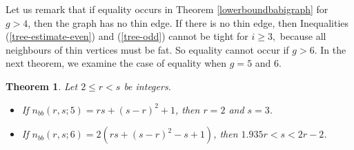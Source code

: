 \documentclass[a4paper,11pt]{article}
\newtheorem{theorem}{Theorem}[section]
\begin{document}
Let us remark that if equality occurs in Theorem \ref{lowerboundbabigraph} for $g>4$, then 
the graph has no thin edge. If there is no thin edge, then Inequalities (\ref{tree-estimate-even})
and (\ref{tree-odd}) cannot be tight for $i\geq 3,$ because all neighbours of thin vertices must
be fat. So equality cannot occur if $g>6$.
In the next theorem, we examine the case of equality when $g=5$ and $6.$

\begin{theorem}\label{equal-5-6}
Let $2\leq r<s$ be integers.  
\begin{itemize}
\item
If $n_{bb}(r,s;5)=rs+(s-r)^2+1$, then $r=2$ and $s=3$.
\item
If $n_{bb}(r,s;6)=2(rs+(s-r)^2-s+1)$, then $1.935r < s < 2r-2$.
\end{itemize}
\end{theorem}
\end{document}
